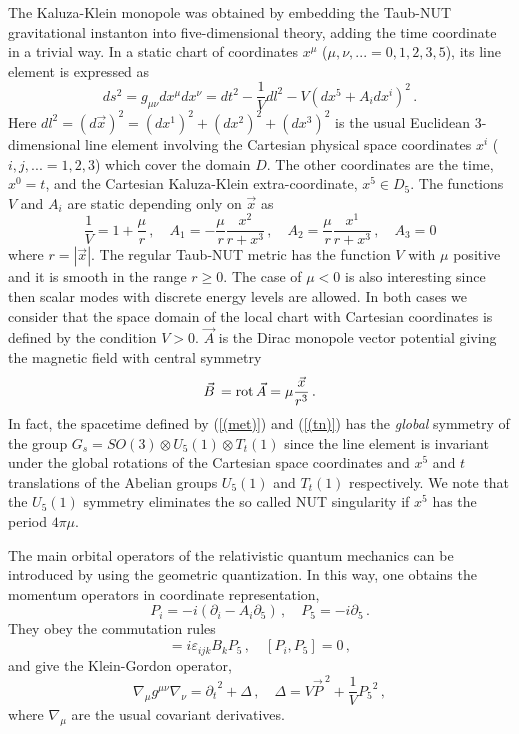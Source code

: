 \documentclass[a4paper,12pt]{article}
\begin{document}
The Kaluza-Klein monopole \cite{GP,So} was obtained by embedding the 
Taub-NUT gravitational instanton into five-dimensional theory, adding 
the time coordinate in a trivial way. In a static chart of 
coordinates $x^{\mu}$ ($\mu, \nu,...=0,1,2,3,5$), its line element is 
expressed as
\begin{equation}\label{(met)} 
ds^{2}=g_{\mu\nu}dx^{\mu}dx^{\nu}=dt^{2}-\frac{1}{V}dl^{2}-V(dx^{5}+
A_{i}dx^{i})^{2}\,.
\end{equation}   
Here $dl^{2}=(d\vec{x})^{2}=(dx^{1})^{2}+(dx^{2})^{2}+(dx^{3})^{2}$
is the usual Euclidean 3-dimensional line element involving the Cartesian 
physical space coordinates $x^{i}$ ($i,j,...=1,2,3$) which 
cover the domain $D$. The other coordinates are the time, $x^{0}=t$, and 
the Cartesian Kaluza-Klein extra-coordinate, $x^{5}\in D_{5}$. 
The functions  $V$ and $A_{i}$ are static  depending only on $\vec{x}$ as     
\begin{equation}\label{(tn)}
\frac{1}{V}=1+\frac{\mu}{r}\,,\quad A_{1}=-\frac{\mu}{r}\frac{x^{2}}
{r+x^{3}}\,,\quad 
A_{2}=\frac{\mu}{r}\frac{x^{1}}{r+x^{3}}\,,\quad A_{3}=0 
\end{equation}
where $r=|\vec{x}|$. The regular Taub-NUT metric has the function $V$ 
with $\mu$ positive and it is smooth in the range $r\geq 0$.  
The case of $\mu<0$ is also interesting since then scalar modes with discrete 
energy levels are allowed. In both cases  we consider that the space 
domain of the local chart with Cartesian coordinates is defined by the 
condition $V>0$.  ${\vec A}$ 
is the Dirac monopole vector potential giving the  magnetic field 
with central symmetry
\begin{equation}
\vec{B}\,={\rm rot}\, \vec{A}=\mu\frac{\vec{x}}{r^3}\,.
\end{equation}
In fact,  the  spacetime defined by (\ref{(met)}) and (\ref{(tn)}) has the 
{\em global} symmetry 
of the  group $G_{s}=SO(3)\otimes U_{5}(1)\otimes T_{t}(1)$ since  
the line element is invariant under the global rotations of the Cartesian space 
coordinates and  $x^{5}$ and $t$ translations of the Abelian groups 
$U_{5}(1)$ and $T_{t}(1)$ respectively. We note that the $U_{5}(1)$ symmetry 
eliminates the so called NUT singularity  if $x^5$ has the period 
$4\pi\mu$. 


The main orbital operators of the relativistic quantum mechanics  can be 
introduced by using the geometric quantization. In this way, one obtains  
the  momentum operators in coordinate representation, 
\begin{equation}
P_{i}=-i(\partial_{i}-A_{i}\partial_{5})\,,\quad P_{5}=-i\partial_{5}\,.
\end{equation} 
They obey the commutation rules
\begin{equation}
[P_{i},P_{j}]=i\varepsilon_{ijk}B_{k}P_{5}\,,\quad
[P_{i},P_{5}]=0\,,
\end{equation}
and give the Klein-Gordon operator,   
\begin{equation}
\nabla_{\mu}g^{\mu\nu}\nabla_{\nu}=
{\partial_{t}}^{2}+\Delta\,,\quad
\Delta= V{\vec{P}\,}^{2}+\frac{1}{V}{P_{5}}^{2}\,,
\end{equation}
where $\nabla_{\mu}$ are the usual covariant derivatives.
\end{document}
